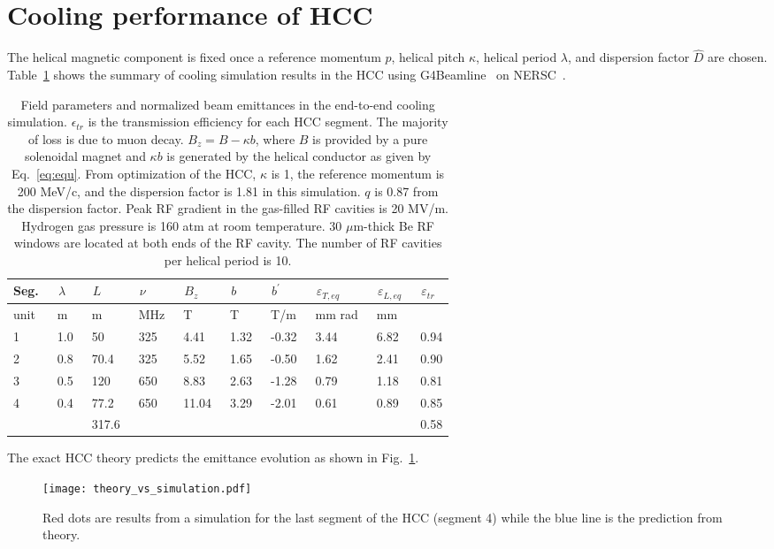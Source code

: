 \documentclass[11pt]{article}
\begin{document}
\section{Cooling performance of HCC}
The helical magnetic component is fixed once a reference momentum $p$, helical pitch $\kappa$, helical period $\lambda$, and dispersion factor $\hat{D}$ are chosen. 
Table~\ref{tab:field} shows the summary of cooling simulation results in the HCC using G4Beamline~\cite{Tom} on NERSC~\cite{nersc}. 
\begin{table}[h]
\caption{Field parameters and normalized beam emittances in the end-to-end cooling simulation. $\epsilon_{tr}$ is the transmission efficiency for each HCC segment. 
The majority of loss is due to muon decay. $B_z = B-\kappa b$, where $B$ is provided by a pure solenoidal magnet and $\kappa b$ is generated by the helical conductor as given by Eq.~\eqref{eq:equ}.  
From optimization of the HCC, $\kappa$ is 1, the reference momentum is 200 MeV/c, and the dispersion factor is 1.81 in this simulation. $q$ is 0.87 from the dispersion factor. Peak RF gradient in the gas-filled RF cavities is 20 MV/m. Hydrogen gas pressure is 160 atm at room temperature. 30 $\mu$m-thick Be RF windows are located at both ends of the RF cavity. The number of RF cavities per helical period is 10. 
}
\label{tab:field}
\centering
\begin{tabular}{|llllllllll|}
\hline
Seg. &\  $\lambda$ &\ $L$ &\  $\nu$ &\ $B_z$ &\ $b$ &\ $b^\prime$ &\ $\varepsilon_{T,eq}$ &\ $\varepsilon_{L,eq}$ &\  $\varepsilon_{tr}$ \\
\hline
unit &\ m &\  m &\ MHz &\ T &\ T &\ T/m &\ mm rad &\ mm &\ \\
\hline
1 &\ 1.0 &\  50 &\ 325 &\ 4.41 &\ 1.32 &\ -0.32 &\  3.44 &\ 6.82 &\ 0.94 \\
2 &\ 0.8 &\  70.4 &\ 325 &\ 5.52 &\ 1.65 &\ -0.50 &\  1.62 &\  2.41 &\ 0.90 \\
3 &\ 0.5 &\  120 &\ 650 &\ 8.83 &\ 2.63 &\ -1.28 &\  0.79 &\  1.18 &\ 0.81 \\
4 &\ 0.4 &\  77.2 &\ 650 &\ 11.04 &\ 3.29 &\ -2.01 &\  0.61 &\  0.89 &\ 0.85 \\
\hline
 &\ &\ 317.6 &\ &\ &\ &\ &\ &\ &\ 0.58 \\
 \hline
\end{tabular}
\end{table}
The exact HCC theory predicts the emittance evolution as shown in Fig.~\ref{fig:theory_vs_simulation}. 
\begin{figure}[h]
 \texttt{[image: theory\_vs\_simulation.pdf]}
 \caption{Red dots are results from a simulation for the last segment of the HCC (segment 4) while the blue line is the prediction from theory.
}
 \label{fig:theory_vs_simulation}
\end{figure}
\end{document}
